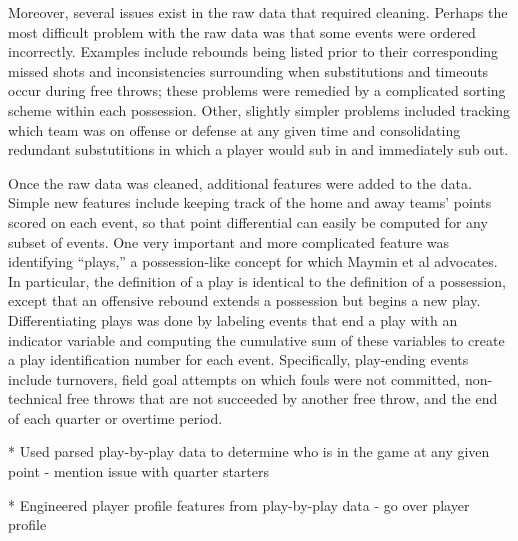 Moreover, several issues exist in the raw data that required cleaning. Perhaps the
most difficult problem with the raw data was that some events were ordered
incorrectly. Examples include rebounds being listed prior to their corresponding
missed shots and inconsistencies surrounding when substitutions and timeouts occur
during free throws; these problems were remedied by a complicated sorting scheme
within each possession. Other, slightly simpler problems included tracking which
team was on offense or defense at any given time and consolidating redundant
substutitions in which a player would sub in and immediately sub out.

Once the raw data was cleaned, additional features were added to the data. Simple
new features include keeping track of the home and away teams' points scored on each
event, so that point differential can easily be computed for any subset of events.
One very important and more complicated feature was identifying ``plays,'' a
possession-like concept for which Maymin et al advocates. In particular, the
definition of a play is identical to the definition of a possession, except that an
offensive rebound extends a possession but begins a new play. Differentiating plays
was done by labeling events that end a play with an indicator variable and computing
the cumulative sum of these variables to create a play identification number for
each event. Specifically, play-ending events include turnovers, field goal attempts
on which fouls were not committed, non-technical free throws that are not succeeded
by another free throw, and the end of each quarter or overtime period.

* Used parsed play-by-play data to determine who is in the game at any given point
    - mention issue with quarter starters


* Engineered player profile features from play-by-play data
    - go over player profile


